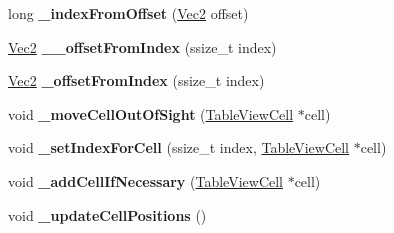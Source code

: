 \begin{DoxyCompactItemize}
\item 
\mbox{\label{classTableView_a830322563225158d0d10e658daf1f31a}} 
long {\bfseries \+\_\+index\+From\+Offset} (\hyperlink{classVec2}{Vec2} offset)
\item 
\mbox{\label{classTableView_a5d0ed22bbcb99ddee253dfb4927c3017}} 
\hyperlink{classVec2}{Vec2} {\bfseries \+\_\+\+\_\+offset\+From\+Index} (ssize\+\_\+t index)
\item 
\mbox{\label{classTableView_a9cfc9aaa07d8dc0ee99146b63ad2385a}} 
\hyperlink{classVec2}{Vec2} {\bfseries \+\_\+offset\+From\+Index} (ssize\+\_\+t index)
\item 
\mbox{\label{classTableView_a422154199b7e02298d30a62bfe4c9596}} 
void {\bfseries \+\_\+move\+Cell\+Out\+Of\+Sight} (\hyperlink{classTableViewCell}{Table\+View\+Cell} $\ast$cell)
\item 
\mbox{\label{classTableView_ac52499f81180a7a70ef3bbe5ed4c9bfe}} 
void {\bfseries \+\_\+set\+Index\+For\+Cell} (ssize\+\_\+t index, \hyperlink{classTableViewCell}{Table\+View\+Cell} $\ast$cell)
\item 
\mbox{\label{classTableView_a749a0546b3ac4113dc848fcd8c21ae1b}} 
void {\bfseries \+\_\+add\+Cell\+If\+Necessary} (\hyperlink{classTableViewCell}{Table\+View\+Cell} $\ast$cell)
\item 
\mbox{\label{classTableView_a766272288f4bd76300915020bb25b5e6}} 
void {\bfseries \+\_\+update\+Cell\+Positions} ()
\end{DoxyCompactItemize}
